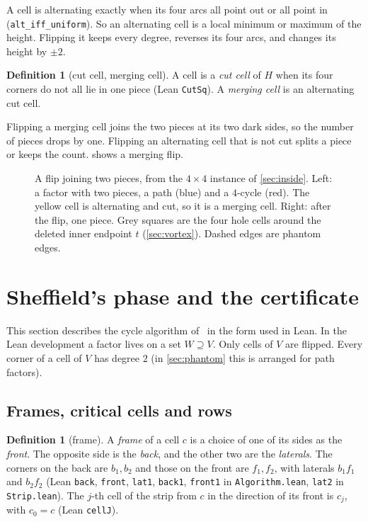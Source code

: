 \documentclass[11pt]{article}
\theoremstyle{plain}
\theoremstyle{definition}
\newtheorem{definition}[theorem]{Definition}
\theoremstyle{remark}
\newcommand{\lean}[1]{\texttt{#1}}
\begin{document}
A cell is alternating exactly when its four arcs all point out or all point in
(\lean{alt\_iff\_uniform}).
So an alternating cell is a local minimum or maximum of the height.
Flipping it keeps every degree, reverses its four arcs, and changes its height by $\pm2$.

\begin{definition}[cut cell, merging cell]
A cell is a \emph{cut cell} of $H$ when its four corners do not all lie in one piece (Lean
\lean{CutSq}).
A \emph{merging cell} is an alternating cut cell.
\end{definition}

Flipping a merging cell joins the two pieces at its two dark sides, so the number of pieces drops by
one.
Flipping an alternating cell that is not cut splits a piece or keeps the count.
 shows a merging flip.

\begin{figure}[t]
\centering

\caption{A flip joining two pieces, from the $4\times4$ instance of \cref{sec:inside}.
Left: a factor with two pieces, a path (blue) and a $4$-cycle (red).
The yellow cell is alternating and cut, so it is a merging cell.
Right: after the flip, one piece.
Grey squares are the four hole cells around the deleted inner endpoint $t$ (\cref{sec:vortex}).
Dashed edges are phantom edges.}
\label{fig:flip}
\end{figure}

\section{Sheffield's phase and the certificate}
\label{sec:sheffield}

This section describes the cycle algorithm of~\cite[\S4]{sheffield2000} in the form used in Lean.
In the Lean development a factor lives on a set $W\supseteq V$.
Only cells of $V$ are flipped.
Every corner of a cell of $V$ has degree $2$ (in \cref{sec:phantom} this is arranged for path
factors).

\subsection{Frames, critical cells and rows}

\begin{definition}[frame]
A \emph{frame} of a cell $c$ is a choice of one of its sides as the \emph{front}.
The opposite side is the \emph{back}, and the other two are the \emph{laterals}.
The corners on the back are $b_1,b_2$ and those on the front are $f_1,f_2$, with laterals
$b_1f_1$ and $b_2f_2$ (Lean \lean{back}, \lean{front}, \lean{lat1}, \lean{back1}, \lean{front1} in
\lean{Algorithm.lean}, \lean{lat2} in \lean{Strip.lean}).
The $j$-th cell of the strip from $c$ in the direction of its front is $c_j$, with $c_0=c$ (Lean
\lean{cellJ}).
\end{definition}
\end{document}
